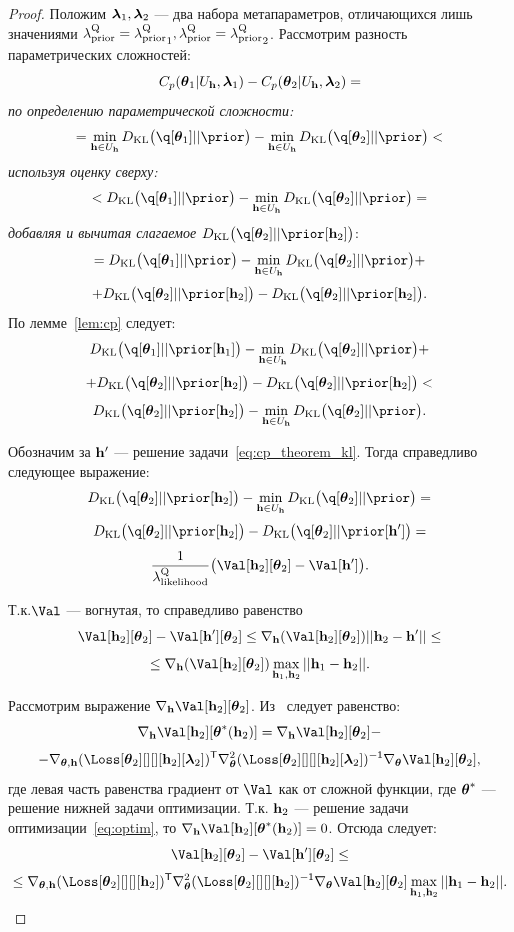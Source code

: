 \begin{proof}
Положим $\boldsymbol{\lambda}_1, \boldsymbol{\lambda}_2$ --- два набора метапараметров, отличающихся лишь значениями $\lambda_\text{prior}^\text{Q} = {\lambda_\text{prior}^\text{Q}}_1, \lambda_\text{prior}^\text{Q} =  {\lambda_\text{prior}^\text{Q}}_2$.
Рассмотрим разность параметрических сложностей:
\[
    C_p(\boldsymbol{\theta}_1|U_{\mathbf{h}}, \boldsymbol{\lambda}_1) - C_p(\boldsymbol{\theta}_2|U_{\mathbf{h}}, \boldsymbol{\lambda}_2) =
\]
\textit{по определению параметрической сложности:}
\[
= \min_{\h \in \Uh} \KL{\q[\teta_1]}{\prior} -  \min_{\h \in \Uh} \KL{\q[\teta_2]}{\prior} <
\]
\textit{используя оценку сверху:}
\[
 <\KL{\q[\teta_1]}{\prior} -   \min_{\h \in \Uh} \KL{\q[\teta_2]}{\prior} = 
\]
\textit{добавляя и вычитая слагаемое }$\KL{\q[\teta_2]}{\prior[\h_2]}$:
\[
  = \KL{\q[\teta_1]}{\prior} -   \min_{\h \in \Uh} \KL{\q[\teta_2]}{\prior} + 
\]
\[
+  \KL{\q[\teta_2]}{\prior[\h_2]} -   \KL{\q[\teta_2]}{\prior[\h_2]}. 
\]
По лемме~\ref{lem:cp} следует:
\[
   \KL{\q[\teta_1]}{\prior[\h_1]} -   \min_{\h \in \Uh} \KL{\q[\teta_2]}{\prior} + 
\]
\[
+  \KL{\q[\teta_2]}{\prior[\h_2]} -   \KL{\q[\teta_2]}{\prior[\h_2]} <
\]
\[
    \KL{\q[\teta_2]}{\prior[\h_2]} -   \min_{\h \in \Uh} \KL{\q[\teta_2]}{\prior}.
\]

Обозначим за $\mathbf{h}'$ --- решение задачи~\eqref{eq:cp_theorem_kl}.
Тогда справедливо следующее выражение:
\[
     \KL{\q[\teta_2]}{\prior[\h_2]} -   \min_{\h \in \Uh} \KL{\q[\teta_2]}{\prior}  = 
\]
\[
    \KL{\q[\teta_2]}{\prior[\h_2]} -   \KL{\q[\teta_2]}{\prior[\h']} = 
\]
\[
   \frac{1}{\lamLL}\bigl(\Val[\h_2][\teta_2] -  \Val[\h']\bigr).
\]

Т.к.$\Val$ --- вогнутая, то справедливо равенство
\[
 \Val[\h_2][\teta_2] -  \Val[\h'][\teta_2] \leq \nabla_{\h} (\Val[\h_2][\teta_2]) ||\h_2 - \h'||  \leq
\]
\[
\leq \nabla_{\h} (\Val[\h_2][\teta_2]) \max_{\h_1, \h_2} ||\h_1 - \h_2||.
\]


Рассмотрим выражение $\nabla_{\h} \Val[\h_2][\teta_2]$. Из~\cite{hoag} следует равенство:
\[
    \nabla_{\h} \Val[\h_2][\teta^{*}(\h_2)]  = \nabla_{\h} \Val[\h_2][\teta_2] -
\]
\[
- \nabla_{\teta, \h} ({\Loss[\teta_2][][][\h_2][\lam_2]})^\mathsf{T} \nabla_{\teta}^2({\Loss[\teta_2][][][\h_2][\lam_2]})^\mathsf{-1} \nabla_{\teta}\Val[\h_2][\teta_2],
\]
где левая часть равенства градиент от $\Val$ как от сложной функции, где $\boldsymbol{\theta}^{*}$ --- решение нижней задачи оптимизации.
Т.к. $\mathbf{h}_2$ --- решение задачи оптимизации~\eqref{eq:optim}, то $\nabla_{\h} \Val[\h_2][\teta^{*}(\h_2)] = 0$.
Отсюда следует:
\[
     \Val[\h_2][\teta_2] -  \Val[\h'][\teta_2] \leq
\]
\[\leq  \nabla_{\teta, \h} (\Loss[\teta_2][][][\h_2])^\mathsf{T} \nabla_{\teta}^2(\Loss[\teta_2][][][\h_2])^\mathsf{-1} \nabla_{\teta}\Val[\h_2][\teta_2] \max_{\h_1, \h_2} ||\h_1 - \h_2||.
\]


\end{proof}
